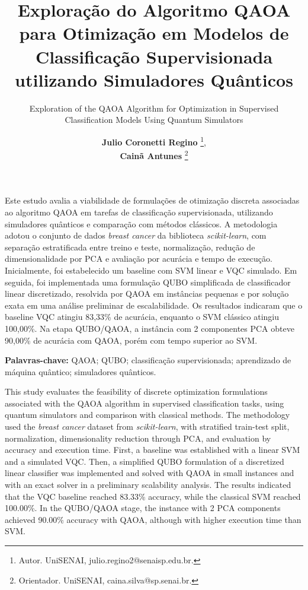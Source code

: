 \documentclass[12pt]{unisenaiclass}
\title{Exploração do Algoritmo QAOA para Otimização em Modelos de Classificação Supervisionada utilizando Simuladores Quânticos}
\subtitle{Exploration of the QAOA Algorithm for Optimization in Supervised Classification Models Using Quantum Simulators}
\author{
    \textbf{Julio Coronetti Regino} \thanks{Autor. UniSENAI, julio.regino2@senaisp.edu.br.},\\
    \textbf{Cainã Antunes} \thanks{Orientador. UniSENAI, caina.silva@sp.senai.br.}
}
\begin{document}
\maketitle

\begin{resumo}
Este estudo avalia a viabilidade de formulações de otimização discreta associadas ao algoritmo QAOA em tarefas de classificação supervisionada, utilizando simuladores quânticos e comparação com métodos clássicos. A metodologia adotou o conjunto de dados \textit{breast cancer} da biblioteca \textit{scikit-learn}, com separação estratificada entre treino e teste, normalização, redução de dimensionalidade por PCA e avaliação por acurácia e tempo de execução. Inicialmente, foi estabelecido um baseline com SVM linear e VQC simulado. Em seguida, foi implementada uma formulação QUBO simplificada de classificador linear discretizado, resolvida por QAOA em instâncias pequenas e por solução exata em uma análise preliminar de escalabilidade. Os resultados indicaram que o baseline VQC atingiu 83,33\% de acurácia, enquanto o SVM clássico atingiu 100,00\%. Na etapa QUBO/QAOA, a instância com 2 componentes PCA obteve 90,00\% de acurácia com QAOA, porém com tempo superior ao SVM.
\end{resumo}

\begin{justify}
    \textbf{Palavras-chave:} QAOA; QUBO; classificação supervisionada; aprendizado de máquina quântico; simuladores quânticos.
\end{justify}

\begin{abstract1}
This study evaluates the feasibility of discrete optimization formulations associated with the QAOA algorithm in supervised classification tasks, using quantum simulators and comparison with classical methods. The methodology used the \textit{breast cancer} dataset from \textit{scikit-learn}, with stratified train-test split, normalization, dimensionality reduction through PCA, and evaluation by accuracy and execution time. First, a baseline was established with a linear SVM and a simulated VQC. Then, a simplified QUBO formulation of a discretized linear classifier was implemented and solved with QAOA in small instances and with an exact solver in a preliminary scalability analysis. The results indicated that the VQC baseline reached 83.33\% accuracy, while the classical SVM reached 100.00\%. In the QUBO/QAOA stage, the instance with 2 PCA components achieved 90.00\% accuracy with QAOA, although with higher execution time than SVM.
\end{abstract1}
\end{document}
